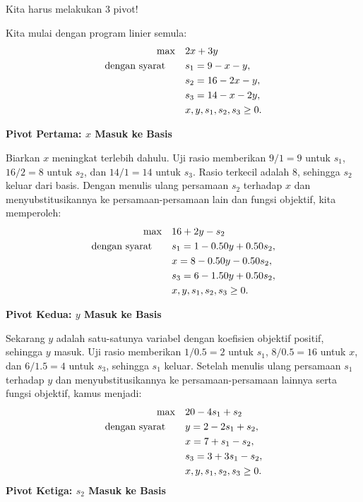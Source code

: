 \begin{solution}
Kita harus melakukan 3 pivot!

Kita mulai dengan program linier semula:
\[
\begin{aligned}
\max\quad & 2x + 3y \\
\mbox{dengan syarat}\quad\quad & s_1 = 9 - x - y, \\
                        & s_2 = 16 - 2x - y, \\
                        & s_3 = 14 - x - 2y, \\
                        & x, y, s_1, s_2, s_3 \ge 0.
\end{aligned}
\]

\textbf{Pivot Pertama: \(x\) Masuk ke Basis}

Biarkan \(x\) meningkat terlebih dahulu. Uji rasio memberikan \(9/1 = 9\) untuk \(s_1\), \(16/2 = 8\) untuk \(s_2\), dan \(14/1 = 14\) untuk \(s_3\). Rasio terkecil adalah \(8\), sehingga \(s_2\) keluar dari basis. Dengan menulis ulang persamaan \(s_2\) terhadap \(x\) dan menyubstitusikannya ke persamaan-persamaan lain dan fungsi objektif, kita memperoleh:
\[
\begin{aligned}
\max\quad & 16 + 2y - s_2 \\
\mbox{dengan syarat}\quad\quad & s_1 = 1 - 0.50y + 0.50s_2, \\
                        & x = 8 - 0.50y - 0.50s_2, \\
                        & s_3 = 6 - 1.50y + 0.50s_2, \\
                        & x, y, s_1, s_2, s_3 \ge 0.
\end{aligned}
\]

\textbf{Pivot Kedua: \(y\) Masuk ke Basis}

Sekarang \(y\) adalah satu-satunya variabel dengan koefisien objektif positif, sehingga \(y\) masuk. Uji rasio memberikan \(1/0.5 = 2\) untuk \(s_1\), \(8/0.5 = 16\) untuk \(x\), dan \(6/1.5 = 4\) untuk \(s_3\), sehingga \(s_1\) keluar. Setelah menulis ulang persamaan \(s_1\) terhadap \(y\) dan menyubstitusikannya ke persamaan-persamaan lainnya serta fungsi objektif, kamus menjadi:
\[
\begin{aligned}
\max\quad & 20 - 4s_1 + s_2 \\
\mbox{dengan syarat}\quad\quad & y = 2 - 2s_1 + s_2, \\
                        & x = 7 + s_1 - s_2, \\
                        & s_3 = 3 + 3s_1 - s_2, \\
                        & x, y, s_1, s_2, s_3 \ge 0.
\end{aligned}
\]
\textbf{Pivot Ketiga: \(s_2\) Masuk ke Basis}


\end{solution}
